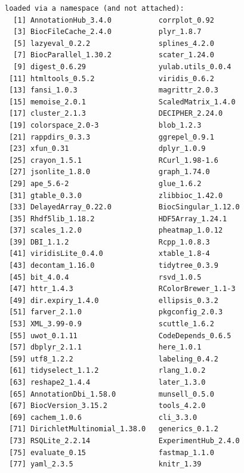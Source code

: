 \documentclass[
]{book}
\begin{document}
\begin{verbatim}
loaded via a namespace (and not attached):
  [1] AnnotationHub_3.4.0           corrplot_0.92                
  [3] BiocFileCache_2.4.0           plyr_1.8.7                   
  [5] lazyeval_0.2.2                splines_4.2.0                
  [7] BiocParallel_1.30.2           scater_1.24.0                
  [9] digest_0.6.29                 yulab.utils_0.0.4            
 [11] htmltools_0.5.2               viridis_0.6.2                
 [13] fansi_1.0.3                   magrittr_2.0.3               
 [15] memoise_2.0.1                 ScaledMatrix_1.4.0           
 [17] cluster_2.1.3                 DECIPHER_2.24.0              
 [19] colorspace_2.0-3              blob_1.2.3                   
 [21] rappdirs_0.3.3                ggrepel_0.9.1                
 [23] xfun_0.31                     dplyr_1.0.9                  
 [25] crayon_1.5.1                  RCurl_1.98-1.6               
 [27] jsonlite_1.8.0                graph_1.74.0                 
 [29] ape_5.6-2                     glue_1.6.2                   
 [31] gtable_0.3.0                  zlibbioc_1.42.0              
 [33] DelayedArray_0.22.0           BiocSingular_1.12.0          
 [35] Rhdf5lib_1.18.2               HDF5Array_1.24.1             
 [37] scales_1.2.0                  pheatmap_1.0.12              
 [39] DBI_1.1.2                     Rcpp_1.0.8.3                 
 [41] viridisLite_0.4.0             xtable_1.8-4                 
 [43] decontam_1.16.0               tidytree_0.3.9               
 [45] bit_4.0.4                     rsvd_1.0.5                   
 [47] httr_1.4.3                    RColorBrewer_1.1-3           
 [49] dir.expiry_1.4.0              ellipsis_0.3.2               
 [51] farver_2.1.0                  pkgconfig_2.0.3              
 [53] XML_3.99-0.9                  scuttle_1.6.2                
 [55] uwot_0.1.11                   CodeDepends_0.6.5            
 [57] dbplyr_2.1.1                  here_1.0.1                   
 [59] utf8_1.2.2                    labeling_0.4.2               
 [61] tidyselect_1.1.2              rlang_1.0.2                  
 [63] reshape2_1.4.4                later_1.3.0                  
 [65] AnnotationDbi_1.58.0          munsell_0.5.0                
 [67] BiocVersion_3.15.2            tools_4.2.0                  
 [69] cachem_1.0.6                  cli_3.3.0                    
 [71] DirichletMultinomial_1.38.0   generics_0.1.2               
 [73] RSQLite_2.2.14                ExperimentHub_2.4.0          
 [75] evaluate_0.15                 fastmap_1.1.0                
 [77] yaml_2.3.5                    knitr_1.39                   

\end{verbatim}
\end{document}

